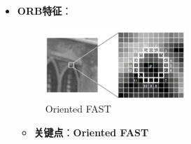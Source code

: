 \documentclass[../main.tex]{subfiles}
\begin{document}
\begin{enumerate}
\begin{itemize}
\begin{enumerate}
\begin{itemize}
\begin{enumerate}
                                        \begin{itemize}
                                            \item \textbf{角点特征(corner)}：ORB, Haris, Shi-Tomasi, FAST
                                            \item \textbf{圆块特征(blob)}：SIFT, SURF, CENSURE
                                        \end{itemize}
                                    \item \textbf{特征点描述}：
                                    \begin{itemize}
                                        \item \textbf{关键点(Key-point)}：描述特征在图像中的\textbf{位置}等信息
                                        \item \textbf{描述子(Descriptor)}：描述该关键点与\textbf{邻域}在\textbf{亮度、颜色、纹理}等方面的图像模式
                                    \end{itemize}
                                    \item \textbf{特征特性}：可重复性\footnote{即大量特征应在下一幅图像中出现}、不变性\footnote{光照不变性、几何不变性（旋转、尺度、视点）}、独特性、鲁棒性\footnote{适应噪声、压缩、模糊}、定位准确性\footnote{包括位置和尺度}、计算效率高
                                \end{enumerate}
                            \item \textbf{ORB特征}：
                                                \begin{figure}[H]
                                                    \centering
                                                    \includegraphics[width=0.5\textwidth]{images/orb1.png}
                                                    \caption{Oriented FAST}
                                                \end{figure}
                                \begin{itemize}
                                    \item \textbf{关键点}：\textbf{Oriented FAST} 

\end{itemize}
\end{itemize}
\end{enumerate}
\end{itemize}
\end{enumerate}
\end{document}

